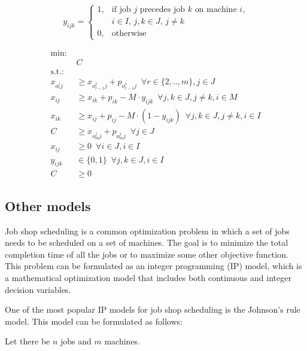 {$$
y_{ijk} = \begin{cases} 1, & \text{if job } j \text{ precedes job } k \text{ on machine } i \text{,}\\ & i \in I \text{, } j, k  \in J \text{, } j \neq k \\ 0, & \text{otherwise} \end{cases}
$$



\begin{align}\textrm{min: }  &  \\
               & C \\
\textrm{s.t.: } &  \\
               x_{o^{j}_{r}j} &  \geq x_{o^{j}_{r-1}j} +p_{o^{j}_{r-1}j} \,\,\, \forall r \in \{2,..,m\}, j \in {J} \\
                   x_{ij}     & \geq x_{ik} + p_{ik} - M \cdot y_{ijk} \,\,\, \forall j,k \in {J}, j \neq k, i \in {M} \\
                   x_{ik}     & \geq x_{ij} + p_{ij} - M \cdot (1-y_{ijk}) \,\,\, \forall j,k \in {J}, j \neq k,i \in {I} \\
                   C          & \geq x_{o^{j}_{m}j} + p_{o^{j}_{m}j} \,\,\, \forall j \in {J} \\
                  x_{ij}      & \geq 0 \,\,\, \forall i \in {J}, i \in {I} \\
                  y_{ijk}     & \in \{0,1\} \,\,\, \forall j,k \in {J}, i \in {I} \\
                  C & \geq 0
              \end{align}



\subsection{Other models}
Job shop scheduling is a common optimization problem in which a set of jobs needs to be scheduled on a set of machines. The goal is to minimize the total completion time of all the jobs or to maximize some other objective function. This problem can be formulated as an integer programming (IP) model, which is a mathematical optimization model that includes both continuous and integer decision variables.

One of the most popular IP models for job shop scheduling is the Johnson's rule model. This model can be formulated as follows:

Let there be $n$ jobs and $m$ machines.

}
